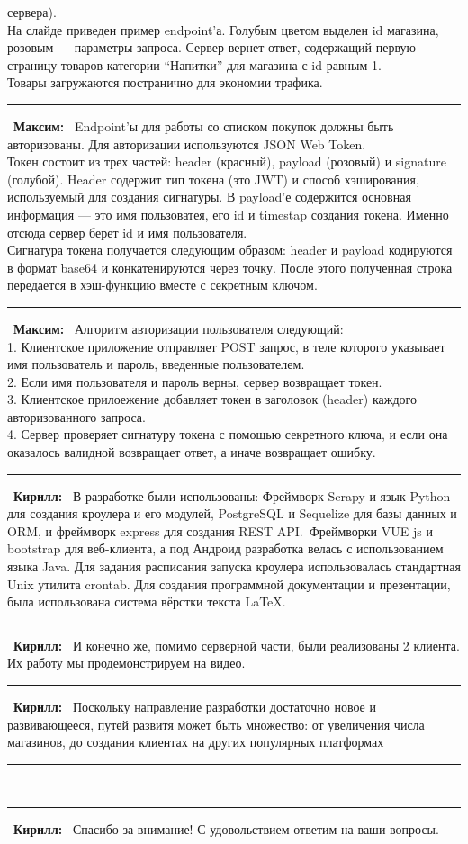 \documentclass[12pt]{article}
\newcommand{\kir}{\textbf{Кирилл: }}
\renewcommand{\max}{\textbf{Максим: }}
\renewcommand{\line}{\noindent\rule{\textwidth}{1pt}}
\begin{document}
сервера).\\ На слайде приведен пример endpoint'а. Голубым цветом выделен id
магазина, розовым — параметры запроса. Сервер вернет ответ, содержащий первую
страницу товаров категории ``Напитки'' для магазина с id равным 1.\\ Товары
загружаются постранично для экономии трафика.\\
\line\
\max\ Endpoint'ы для работы со списком покупок должны быть авторизованы. Для
авторизации используются JSON Web Token.\\ Токен состоит из трех частей:
header (красный), payload (розовый) и signature (голубой). Header содержит тип
токена (это JWT) и способ хэширования, используемый для создания сигнатуры.  В
payload'е содержится основная информация — это имя пользоватея, его id и
timestap создания токена. Именно отсюда сервер берет id и имя пользователя.\\
Сигнатура токена получается следующим образом: header и payload кодируются в
формат base64 и конкатенируются через точку. После этого полученная строка
передается в хэш-функцию вместе с секретным ключом.\\
\line\
\max\ Алгоритм авторизации пользователя следующий:\\
1. Клиентское приложение отправляет POST запрос, в теле которого указывает имя
пользователь и пароль, введенные пользователем.\\
2. Если имя пользователя и пароль верны, сервер возвращает токен.\\
3. Клиентское прилоежение добавляет токен в заголовок (header) каждого авторизованного запроса.\\
4. Сервер проверяет сигнатуру токена с помощью секретного ключа, и если она
оказалось валидной возвращает ответ, а иначе возвращает ошибку.\\
\line\
\kir\ В разработке были использованы: Фреймворк Scrapy и язык Python для
создания кроулера и его модулей, PostgreSQL и Sequelize для базы данных и ORM,
и фреймворк express для создания REST API.\ Фреймворки VUE js и bootstrap для
веб-клиента, а под Андроид разработка велась с использованием языка Java.  Для
задания расписания запуска кроулера использовалась стандартная Unix утилита
crontab. Для создания программной документации и презентации, была использована
система вёрстки текста {\LaTeX}.\\
\line\
\kir\ И конечно же, помимо серверной части, были реализованы 2 клиента. Их работу мы продемонстрируем на видео.\\
\line\
\kir\ Поскольку направление разработки достаточно новое и развивающееся, путей развитя может быть множество: от увеличения числа магазинов, до создания клиентах на других популярных платформах\\
\line\
\line\
\kir\ Спасибо за внимание! С удовольствием ответим на ваши вопросы.
\end{document}

